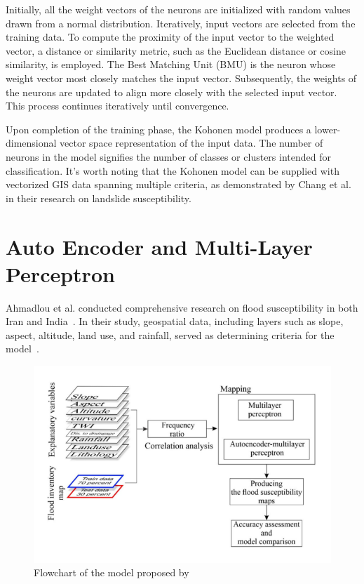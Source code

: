 \documentclass[a4paper,12pt]{Classes/RoboticsLaTeX}
\begin{document}
	Initially, all the weight vectors of the neurons are initialized with random values drawn from a normal distribution. Iteratively, input vectors are selected from the 
	training data. To compute the proximity of the input vector to the weighted vector, a distance or similarity metric, such as the Euclidean distance or cosine similarity, 
	is employed. The Best Matching Unit (BMU) is the neuron whose weight vector most closely matches the input vector. Subsequently, the weights of the neurons are updated to 
	align more closely with the selected input vector. This process continues iteratively until convergence.

	Upon completion of the training phase, the Kohonen model produces a lower-dimensional vector space representation of the input data. The number of neurons in the model 
	signifies the number of classes or clusters intended for classification. It's worth noting that the Kohonen model can be supplied with vectorized GIS data spanning multiple 
	criteria, as demonstrated by Chang et al. in their research on landslide susceptibility\cite{chang2020}.

	\section{Auto Encoder and Multi-Layer Perceptron}

	Ahmadlou et al. conducted comprehensive research on flood susceptibility in both Iran and India~\cite{ahmadlou2020}. In their study, geospatial data, including layers such as 
	slope, aspect, altitude, land use, and rainfall, served as determining criteria for the model~\cite{ahmadlou2020}.

	\begin{figure}[H]
		\centering
		\includegraphics[width=1\textwidth]{Figures/AutoEncoder.png} %
		\caption{Flowchart of the model proposed by\cite{ahmadlou2020}}
		\label{fig:my_label8} %
	\end{figure}
\end{document}
